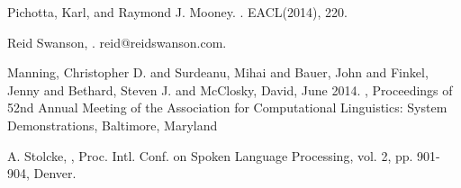 \documentclass[11pt]{article}
\begin{document}
\begin{thebibliography}{}
	Pichotta, Karl, and Raymond J. Mooney.
	.
	 \newblock EACL(2014), 220.
	  

  	Reid Swanson,
  	.
  	\newblock reid@reidswanson.com.
  
	Manning, Christopher D. and  Surdeanu, Mihai  and  Bauer, John  and  Finkel, Jenny  and  Bethard, Steven J. and  McClosky, David,
	\newblock June 2014.
	,
	\newblock Proceedings of 52nd Annual Meeting of the Association for Computational Linguistics: System Demonstrations,
	\newblock Baltimore, Maryland

	A. Stolcke,
	,
	\newblock Proc. Intl. Conf. on Spoken Language Processing,
	\newblock vol. 2, pp. 901-904, Denver.


\end{thebibliography}
\end{document}
